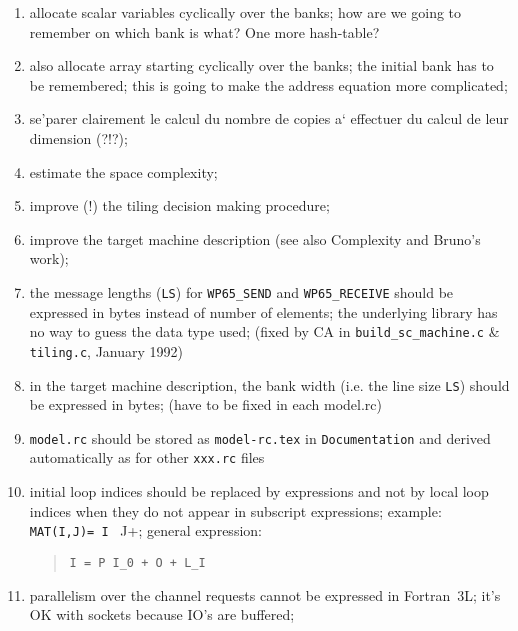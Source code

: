 \begin{enumerate}

  \item allocate scalar variables cyclically over the banks; how are we
	going to remember on which bank is what? One more hash-table?

  \item also allocate array starting cyclically over the banks; the initial
	bank has to be remembered; this is going to make the address equation
	more complicated;

  \item se'parer clairement le calcul du nombre de copies
	a` effectuer du calcul de leur dimension (?!?);

  \item estimate the space complexity;

  \item improve (!) the tiling decision making procedure;

  \item improve the target machine description (see also Complexity and	
	Bruno's work);

  \item {}
	the message lengths (\verb+LS+) 
	for \verb+WP65_SEND+ and \verb+WP65_RECEIVE+ should be
	expressed in bytes instead of number of elements; 
	the underlying library has no way to guess the data type used;
	(fixed by CA in \verb+build_sc_machine.c+ \& 
	\verb+tiling.c+, January 1992)

  \item in the target machine description, the bank width (i.e. the
	line size \verb+LS+) should be expressed in bytes;
	(have to be fixed in each model.rc)

  \item \verb+model.rc+ should be stored as \verb+model-rc.tex+ in
	\verb+Documentation+ and derived automatically as for other
	\verb+xxx.rc+ files

  \item initial loop indices should be replaced by expressions and not
	by local loop indices when they do not appear in subscript
	expressions; example: \verb+MAT(I,J)= I + J+; general
	expression:
	\begin{quote}
	\verb/I = P I_0 + O + L_I/
	\end{quote}

  \item parallelism over the channel requests cannot be expressed in
	Fortran~3L; it's OK with sockets because IO's are buffered;


\end{enumerate}
